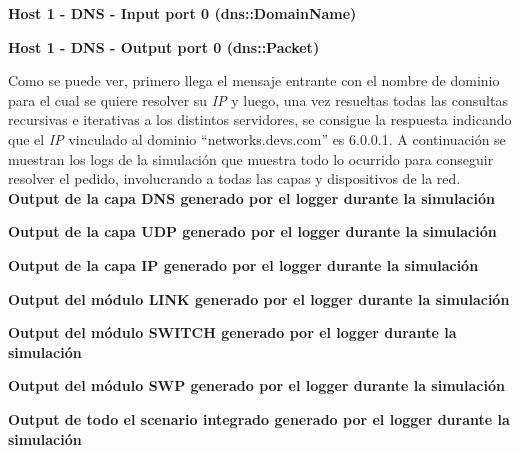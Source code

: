\documentclass[10pt,a4paper]{article}
\begin{document}
\textbf{Host 1 - DNS - Input port 0 (dns::DomainName)}


\textbf{Host 1 - DNS - Output port 0 (dns::Packet)}


Como se puede ver, primero llega el mensaje entrante con el nombre de dominio para el cual se quiere resolver su \textit{IP} y luego, una vez resueltas todas las consultas recursivas e iterativas a los distintos servidores, se consigue la respuesta indicando que el \textit{IP} vinculado al dominio ``networks.devs.com'' es 6.0.0.1. A continuación se muestran los logs de la simulación que muestra todo lo ocurrido para conseguir resolver el pedido, involucrando a todas las capas y dispositivos de la red. \\

\textbf{Output de la capa DNS generado por el logger durante la simulación}


\textbf{Output de la capa UDP generado por el logger durante la simulación}


\textbf{Output de la capa IP generado por el logger durante la simulación}


\textbf{Output del módulo LINK generado por el logger durante la simulación}


\textbf{Output del módulo SWITCH generado por el logger durante la simulación}


\textbf{Output del módulo SWP generado por el logger durante la simulación}


\textbf{Output de todo el scenario integrado generado por el logger durante la simulación}

\end{document}
